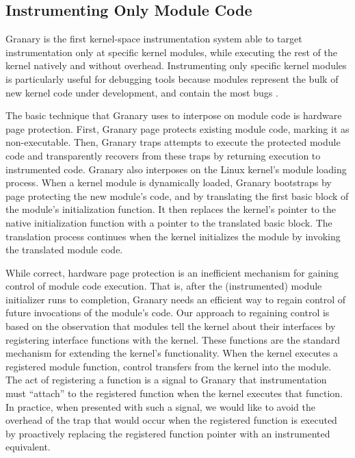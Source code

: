 \documentclass[preprint]{sigplanconf}
\begin{document}
\subsection{Instrumenting Only Module Code}\label{sec:module}

Granary is the first kernel-space instrumentation system able to target instrumentation only at specific kernel modules, while executing the rest of the kernel natively and without overhead. Instrumenting only specific kernel modules is particularly useful for debugging tools because modules represent the bulk of new kernel code under development, and contain the most bugs \cite{FaultsInLinux}.

The basic technique that Granary uses to interpose on module code is hardware page protection. First, Granary page protects existing module code, marking it as non-executable. Then, Granary traps attempts to execute the protected module code and transparently recovers from these traps by returning execution to instrumented code. Granary also interposes on the Linux kernel's module loading process. When a kernel module is dynamically loaded, Granary bootstraps by page protecting the new module's code, and by translating the first basic block of the module's initialization function.  It then replaces the kernel's pointer to the native initialization function with a pointer to the translated basic block. The translation process continues when the kernel initializes the module by invoking the translated module code. 

While correct, hardware page protection is an inefficient mechanism for gaining control of module code execution. That is, after the (instrumented) module initializer runs to completion, Granary needs an efficient way to regain control of future invocations of the module's code. Our approach to regaining control is based on the observation that modules tell the kernel about their interfaces by registering interface functions with the kernel. These functions are the standard mechanism for extending the kernel's functionality. When the kernel executes a registered module function, control transfers from the kernel into the module. The act of registering a function is a signal to Granary that instrumentation must ``attach'' to the registered function when the kernel executes that function. In practice, when presented with such a signal, we would like to avoid the overhead of the trap that would occur when the registered function is executed by proactively replacing the registered function pointer with an instrumented equivalent.
\end{document}
